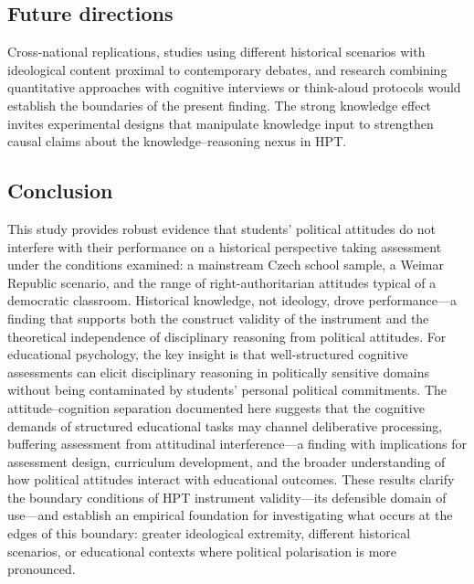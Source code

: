 \documentclass[pdflatex,sn-apa]{sn-jnl}%
\begin{document}
\subsection{Future directions}\label{subsec:future}

Cross-national replications, studies using different historical scenarios with ideological content proximal to contemporary debates, and research combining quantitative approaches with cognitive interviews or think-aloud protocols would establish the boundaries of the present finding. The strong knowledge effect invites experimental designs that manipulate knowledge input to strengthen causal claims about the knowledge--reasoning nexus in HPT.

\subsection{Conclusion}\label{subsec:conclusion}

This study provides robust evidence that students' political attitudes do not interfere with their performance on a historical perspective taking assessment under the conditions examined: a mainstream Czech school sample, a Weimar Republic scenario, and the range of right-authoritarian attitudes typical of a democratic classroom. Historical knowledge, not ideology, drove performance---a finding that supports both the construct validity of the instrument and the theoretical independence of disciplinary reasoning from political attitudes. For educational psychology, the key insight is that well-structured cognitive assessments can elicit disciplinary reasoning in politically sensitive domains without being contaminated by students' personal political commitments. The attitude--cognition separation documented here suggests that the cognitive demands of structured educational tasks may channel deliberative processing, buffering assessment from attitudinal interference---a finding with implications for assessment design, curriculum development, and the broader understanding of how political attitudes interact with educational outcomes. These results clarify the boundary conditions of HPT instrument validity---its defensible domain of use---and establish an empirical foundation for investigating what occurs at the edges of this boundary: greater ideological extremity, different historical scenarios, or educational contexts where political polarisation is more pronounced.

\end{document}
